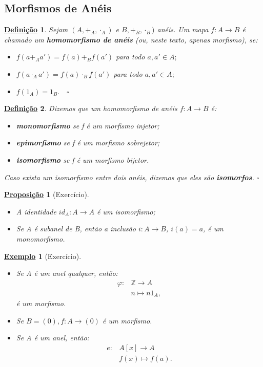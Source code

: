 \documentclass{article}
\newtheorem*{def*}{\underline{Defini\c c\~ao}}
\newtheorem*{prop*}{\underline{Proposi\c c\~ao}}
\newtheorem{example}{\underline{Exemplo}}
\begin{document}
\subsection{Morfismos de Anéis}
\begin{def*}
  Sejam \((A, +_{A}, \cdot_{A})\) e \(B, +_{B}, \cdot_{B})\) anéis. Um mapa \(f:A\rightarrow B\) é chamado um \textbf{homomorfismo de anéis}
  (ou, neste texto, apenas morfismo), se:
  \begin{itemize}
    \item[i)] \(f(a +_{A} a') = f(a) +_{B} f(a')\) para todo \(a, a'\in A;\)
    \item[ii)] \(f(a \cdot_{A} a') = f(a)\cdot_{B}f(a')\) para todo \(a, a'\in A;\)
    \item[iii)] \(f(1_{A}) = 1_{B}.\quad\square\)
  \end{itemize}
\end{def*}
\begin{def*}
  Dizemos que um homomorfismo de anéis \(f:A\rightarrow B\) é:
  \begin{itemize}
    \item[1)] \textbf{monomorfismo} se f é um morfismo injetor;
    \item[2)] \textbf{epimorfismo} se f é um morfismo sobrejetor;
    \item[3)] \textbf{isomorfismo} se f é um morfismo bijetor.
  \end{itemize}
  Caso exista um isomorfismo entre dois anéis, dizemos que eles são \textbf{isomorfos}. \(\square\)
\end{def*}
\begin{prop*}[Exercício]
  \begin{itemize}
    \item[1)] A identidade \(id_{A}:A\rightarrow A\) é um isomorfismo;
    \item[2)] Se A é subanel de B, então a inclusão \(i:A\rightarrow B\), \(i(a) = a\), é
      um monomorfismo.
  \end{itemize}
\end{prop*}
\begin{example}[Exercício]
  \begin{itemize}
    \item[1)] Se A é um anel qualquer, então:
      \begin{align*}
        \varphi:&\mathbb{Z}\rightarrow A\\
                &n\mapsto n1_{A},
      \end{align*}
      é um morfismo.
    \item[2)] Se \(B=(0), f:A\rightarrow (0)\) é um morfismo.
    \item[3)] Se A é um anel, então:
      \begin{align*}
        e:&A[x]\rightarrow A\\
          &f(x)\mapsto f(a).
      \end{align*}
  \end{itemize}
\end{example}
\end{document}

